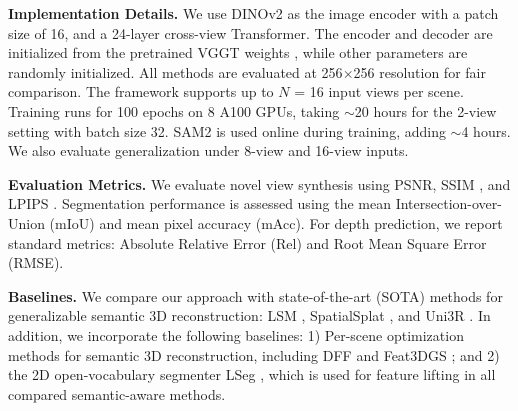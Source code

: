 \documentclass[runningheads]{llncs}
\begin{document}
\noindent
\textbf{Implementation Details.} 
We use DINOv2 \cite{dinov2} as the image encoder with a patch size of 16, and a 24-layer cross-view Transformer. The encoder and decoder are initialized from the pretrained VGGT weights \cite{vggt}, while other parameters are randomly initialized.
All methods are evaluated at 256$\times$256 resolution for fair comparison. 
The framework supports up to $N$ = 16 input views per scene.
Training runs for 100 epochs on 8 A100 GPUs, taking $\sim$20 hours for the 2-view setting with batch size 32. 
SAM2 is used online during training, adding $\sim$4 hours. 
We also evaluate generalization under 8-view and 16-view inputs. 



\noindent
\textbf{Evaluation Metrics.} 
We evaluate novel view synthesis using PSNR, SSIM \cite{ssim}, and LPIPS \cite{lpips}.
Segmentation performance is assessed using the mean Intersection-over-Union (mIoU) and mean pixel accuracy (mAcc). 
For depth prediction, we report standard metrics: Absolute Relative Error (Rel) and Root Mean Square Error (RMSE).


\noindent
\textbf{Baselines.} 
We compare our approach with state-of-the-art (SOTA) methods for generalizable semantic 3D reconstruction: LSM \cite{lsm}, SpatialSplat \cite{spatialsplat}, and Uni3R \cite{uni3r}. 
In addition, we incorporate the following baselines: 1) Per-scene optimization methods for semantic 3D reconstruction, including DFF \cite{DFF} and Feat3DGS \cite{feature3dgs}; and 2) the 2D open-vocabulary segmenter LSeg \cite{LSeg}, which is used for feature lifting in all compared semantic-aware methods. 
\end{document}
